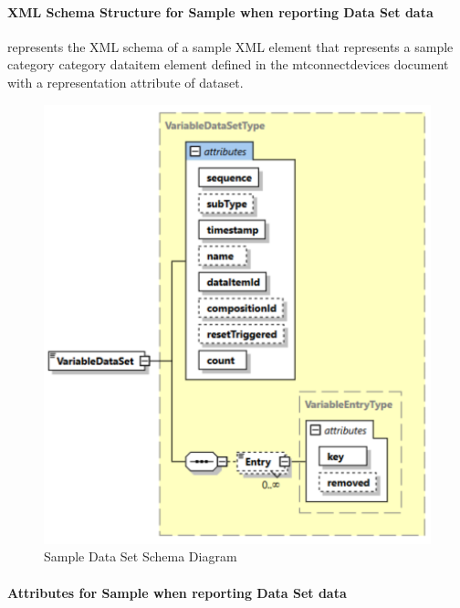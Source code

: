 \documentclass{mtconnect}	%
\providecommand{\DIFadd}[1]{{\hspace{0pt}\protect\color{blue}#1}} %
\providecommand{\DIFaddFL}[1]{\DIFadd{#1}} %
\begin{document}
\paragraph{\DIFadd{XML Schema Structure for Sample when reporting Data Set data}}\DIFadd{\mbox{}
}\label{sec:XML Schema Structure for SAMPLE when reporting Data Set data}

\DIFadd{ represents the XML schema of a \gls{sample} XML element that represents a \gls{sample category} category \gls{dataitem} element defined in the \gls{mtconnectdevices} document with a \gls{representation} attribute of \gls{dataset}.
}\begin{figure}[ht]
  \centering
  \includegraphics[width=1.0\textwidth]{figures/sample-data-set-schema-diagram.png}
  \caption{\DIFaddFL{Sample Data Set Schema Diagram}}
  \label{fig:sample-data-set-schema-diagram}
\end{figure}
\FloatBarrier

\paragraph{\DIFadd{Attributes for Sample when reporting Data Set data}}\DIFadd{\mbox{}
}\label{sec:Attributes for SAMPLE when reporting Data Set data}
\end{document}

